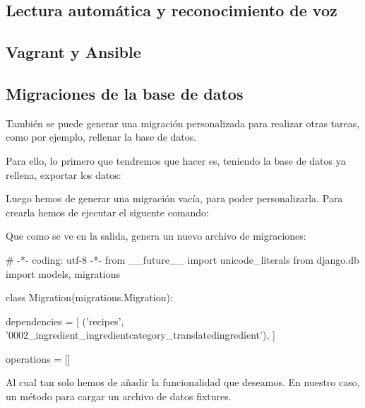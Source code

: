 \subsection{Lectura automática y reconocimiento de voz}

    

\subsection{Vagrant y Ansible}




\subsection{Migraciones de la base de datos}

También se puede generar una migración personalizada para realizar otras
tareas, como por ejemplo, rellenar la base de datos.

Para ello, lo primero que tendremos que hacer es, teniendo la base de datos ya
rellena, exportar los datos:

\begin{bashcode}

\end{bashcode}


Luego hemos de generar una migración vacía, para poder personalizarla. Para
crearla hemos de ejecutar el siguente comando:


Que como se ve en la salida, genera un nuevo archivo de migraciones:


\begin{pythoncode}
# -*- coding: utf-8 -*-
from __future__ import unicode_literals
from django.db import models, migrations
        
class Migration(migrations.Migration):
    
    dependencies = [
        ('recipes', '0002_ingredient_ingredientcategory_translatedingredient'),
    ]

    operations = []

\end{pythoncode}

Al cual tan solo hemos de añadir la funcionalidad que deseamos. En nuestro
caso, un método para cargar un archivo de datos fixtures.

